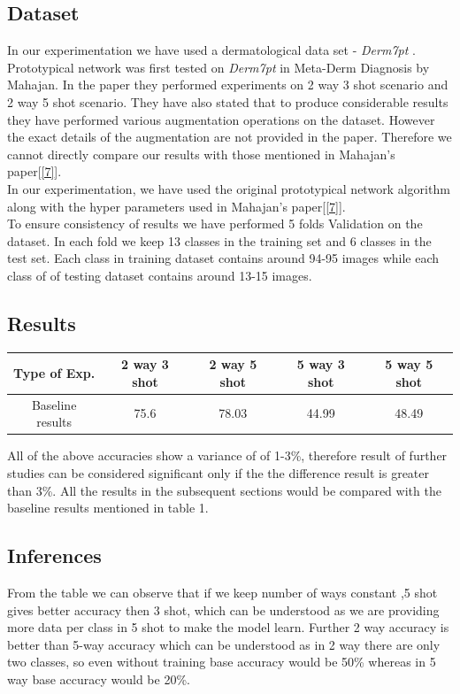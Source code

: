 \subsection{Dataset}
In our experimentation we have used a dermatological data set - \textit{Derm7pt} . Prototypical network was first tested on \textit{Derm7pt} in Meta-Derm Diagnosis by Mahajan. In the paper they performed experiments on 2 way 3 shot scenario and 2 way 5 shot scenario. They have also stated that to produce considerable results they have performed various augmentation operations on the dataset. However the exact details of the augmentation are not provided in the paper.  Therefore we cannot directly compare our results with those mentioned in Mahajan's paper[\ref{7}].\\
In our experimentation, we have used the original prototypical network algorithm along with the hyper parameters used in Mahajan's paper[\ref{7}]. \\ 
To ensure consistency of results we have performed 5 folds Validation on the dataset. In each fold we keep 13 classes in the training set and 6 classes in the test set. Each class in training dataset contains around 94-95 images while each class of of testing dataset contains around 13-15 images.
\subsection{Results}
\begin{center}
\begin{tabular}{|c |c |c |c|c|}
\hline
Type of Exp. & 2 way 3 shot  &2 way 5 shot & 5 way 3 shot & 5 way 5 shot \\
\hline\hline
Baseline results & 75.6 & 78.03 & 44.99  & 48.49 \\
\hline
\end{tabular}
\end{center}
All of the above accuracies show a variance of of 1-3\%, therefore result of further studies can be considered significant only if the the difference result is greater than 3\%. All the results in the subsequent sections would be compared with the baseline results mentioned in table 1.
\subsection{Inferences}
From the table we can observe that if we keep number of ways constant ,5 shot gives better accuracy then 3 shot, which can be understood as we are providing more data per class in 5 shot to make the model learn. Further 2 way accuracy is better than 5-way accuracy which can be understood as in 2 way there are only two classes, so even without training base accuracy would  be 50\% whereas in 5 way base accuracy would be 20\%.
\newpage
